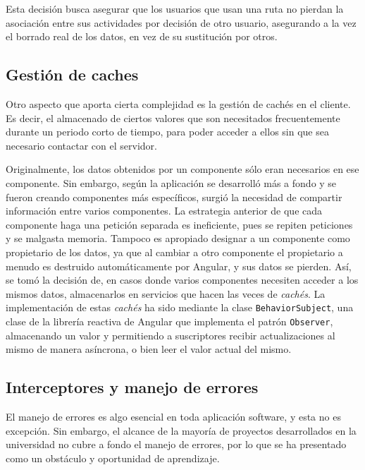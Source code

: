Esta decisión busca asegurar que los usuarios que usan una ruta no pierdan la asociación entre sus actividades por decisión de otro usuario, asegurando a la vez el borrado real de los datos, en vez de su sustitución por otros.

\subsection{Gestión de caches}
Otro aspecto que aporta cierta complejidad es la gestión de cachés en el cliente. Es decir, el almacenado de ciertos valores que son necesitados frecuentemente durante un periodo corto de tiempo, para poder acceder a ellos sin que sea necesario contactar con el servidor.

Originalmente, los datos obtenidos por un componente sólo eran necesarios en ese componente. Sin embargo, según la aplicación se desarrolló más a fondo y se fueron creando componentes más específicos, surgió la necesidad de compartir información entre varios componentes. La estrategia anterior de que cada componente haga una petición separada es ineficiente, pues se repiten peticiones y se malgasta memoria. Tampoco es apropiado designar a un componente como propietario de los datos, ya que al cambiar a otro componente el propietario a menudo es destruido automáticamente por Angular, y sus datos se pierden. Así, se tomó la decisión de, en casos donde varios componentes necesiten acceder a los mismos datos, almacenarlos en servicios que hacen las veces de \textit{cachés}. La implementación de estas \textit{cachés} ha sido mediante la clase \texttt{BehaviorSubject}, una clase de la librería reactiva de Angular que implementa el patrón \texttt{Observer}, almacenando un valor y permitiendo a suscriptores recibir actualizaciones al mismo de manera asíncrona, o bien leer el valor actual del mismo.

\subsection{Interceptores y manejo de errores}
El manejo de errores es algo esencial en toda aplicación software, y esta no es excepción. Sin embargo, el alcance de la mayoría de proyectos desarrollados en la universidad no cubre a fondo el manejo de errores, por lo que se ha presentado como un obstáculo y oportunidad de aprendizaje.

